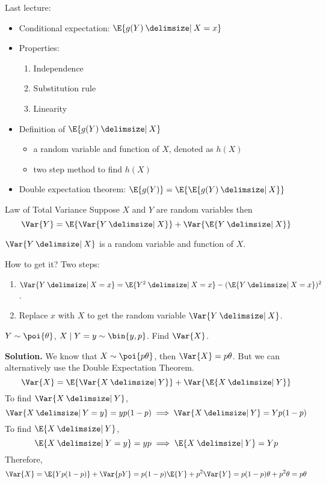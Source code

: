 Last lecture:
\begin{itemize}
    \item Conditional expectation: $ \E{g(Y)\given X=x} $
    \item Properties:
          \begin{enumerate}[label=(\arabic*)]
              \item Independence
              \item Substitution rule
              \item Linearity
          \end{enumerate}
    \item Definition of $ \E{g(Y)\given X} $
          \begin{itemize}
              \item a random variable and function of $ X $, denoted as $ h(X) $
              \item two step method to find $ h(X) $
          \end{itemize}
    \item Double expectation theorem: $ \E{g(Y)}=\E{\E{g(Y)\given X}} $
\end{itemize}
\begin{Theorem}{Law of Total Variance}{}
    Suppose $ X $ and $ Y $ are random variables then
    \[ \Var{Y}=\E{\Var{Y\given X}}+\Var{\E{Y\given X}} \]
\end{Theorem}
\begin{Remark}{}{}
    $ \Var{Y\given X} $ is a random variable and function of $ X $.

    How to get it? Two steps:
    \begin{enumerate}
        \item $ \Var{Y\given X=x}=\E{Y^2\given X=x}-(\E{Y\given X=x})^2 $.
        \item Replace $ x $ with $ X $ to get
              the random variable $ \Var{Y\given X} $.
    \end{enumerate}
\end{Remark}
\begin{Example}{}{}
    $ Y \sim \poi{\theta} $, $ X\mid Y=y \sim \bin{y,p} $. Find
    $ \Var{X} $.

    \textbf{Solution.} We know that $ X \sim \poi{p\theta} $,
    then $ \Var{X}=p\theta $. But we can alternatively
    use the Double Expectation Theorem.
    \[ \Var{X}=\E{\Var{X\given Y}}+\Var{\E{X\given Y}} \]
    To find $ \Var{X\given Y} $,
    \[ \Var{X\given Y=y}=yp(1-p)\implies \Var{X\given Y}=Yp(1-p) \]
    To find $ \E{X\given Y} $,
    \[ \E{X\given Y=y}=yp\implies \E{X\given Y}=Yp \]
    Therefore,
    \[ \Var{X}=\E{Yp(1-p)}+\Var{pY}=p(1-p)\E{Y}+p^2\Var{Y}=
        p(1-p)\theta+p^2\theta=p\theta \]
\end{Example}

